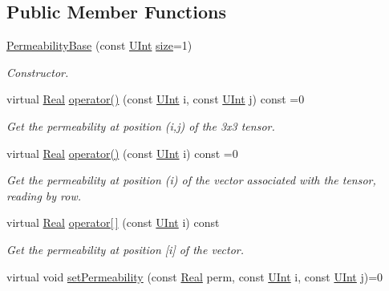 \subsection*{Public Member Functions}
\begin{DoxyCompactItemize}
\item 
\hyperlink{classFVCode3D_1_1PermeabilityBase_af5fec5e9b68e5aca193f845a81226f6c}{Permeability\+Base} (const \hyperlink{namespaceFVCode3D_a4bf7e328c75d0fd504050d040ebe9eda}{U\+Int} \hyperlink{classFVCode3D_1_1PermeabilityBase_a5e4bd70177de114e9165f9b81852862c}{size}=1)
\begin{DoxyCompactList}\small\item\em Constructor. \end{DoxyCompactList}\item 
virtual \hyperlink{namespaceFVCode3D_a40c1f5588a248569d80aa5f867080e83}{Real} \hyperlink{classFVCode3D_1_1PermeabilityBase_abd0550c6acbe86723c9ddfee18cb9da5}{operator()} (const \hyperlink{namespaceFVCode3D_a4bf7e328c75d0fd504050d040ebe9eda}{U\+Int} i, const \hyperlink{namespaceFVCode3D_a4bf7e328c75d0fd504050d040ebe9eda}{U\+Int} j) const =0
\begin{DoxyCompactList}\small\item\em Get the permeability at position (i,j) of the 3x3 tensor. \end{DoxyCompactList}\item 
virtual \hyperlink{namespaceFVCode3D_a40c1f5588a248569d80aa5f867080e83}{Real} \hyperlink{classFVCode3D_1_1PermeabilityBase_a4cc07f9b2cb882f1328b11451bd98f8d}{operator()} (const \hyperlink{namespaceFVCode3D_a4bf7e328c75d0fd504050d040ebe9eda}{U\+Int} i) const =0
\begin{DoxyCompactList}\small\item\em Get the permeability at position (i) of the vector associated with the tensor, reading by row. \end{DoxyCompactList}\item 
virtual \hyperlink{namespaceFVCode3D_a40c1f5588a248569d80aa5f867080e83}{Real} \hyperlink{classFVCode3D_1_1PermeabilityBase_a43e9232aeb8a7f647601091bd8af3410}{operator\mbox{[}$\,$\mbox{]}} (const \hyperlink{namespaceFVCode3D_a4bf7e328c75d0fd504050d040ebe9eda}{U\+Int} i) const 
\begin{DoxyCompactList}\small\item\em Get the permeability at position \mbox{[}i\mbox{]} of the vector. \end{DoxyCompactList}\item 
virtual void \hyperlink{classFVCode3D_1_1PermeabilityBase_a6ac9a7c1b7ed948194429891dc839706}{set\+Permeability} (const \hyperlink{namespaceFVCode3D_a40c1f5588a248569d80aa5f867080e83}{Real} perm, const \hyperlink{namespaceFVCode3D_a4bf7e328c75d0fd504050d040ebe9eda}{U\+Int} i, const \hyperlink{namespaceFVCode3D_a4bf7e328c75d0fd504050d040ebe9eda}{U\+Int} j)=0

\end{DoxyCompactItemize}
